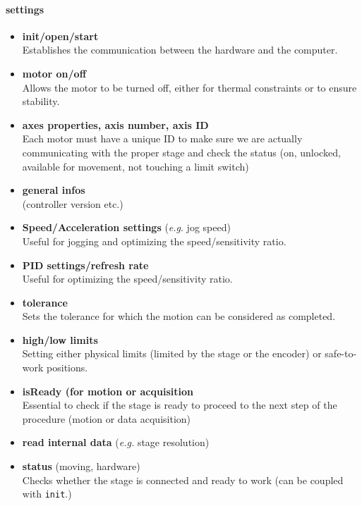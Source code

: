 \documentclass[10pt,letter,twoside]{report}
\begin{document}
			\paragraph{settings}
			\begin{itemize}
			\item \textbf{init/open/start}\\
			Establishes the communication between the hardware and the computer.
			\item \textbf{motor on/off}\\
			Allows the motor to be turned off, either for thermal constraints or to ensure stability.
			\item \textbf{axes properties, axis number, axis ID}\\
			Each motor must have a unique ID to make sure we are actually communicating with the proper stage and check the status 
			(on, unlocked, available for movement, not touching a limit switch)
			\item \textbf{general infos}\\
			(controller version etc.)
			\item \textbf{Speed/Acceleration settings} (\textit{e.g}. jog speed)\\
			Useful for jogging and optimizing the speed/sensitivity ratio.
			\item \textbf{PID settings/refresh rate}\\
			Useful for optimizing the speed/sensitivity ratio.			
			\item \textbf{tolerance}\\
			Sets the tolerance for which the motion can be considered as completed.\\

			\item \textbf{high/low limits}\\
			Setting either physical limits (limited by the stage or the encoder) or safe-to-work positions.
			\item \textbf{isReady (for motion or acquisition}\\
			Essential to check if the stage is ready to proceed to the next step of the procedure (motion or data acquisition)
			\item \textbf{read internal data} (\textit{e.g.} stage resolution)\\
			\item \textbf{status} (moving, hardware)\\
			Checks whether the stage is connected and ready to work (can be coupled with \verb!init!.)\\
				

\end{itemize}
\end{document}
